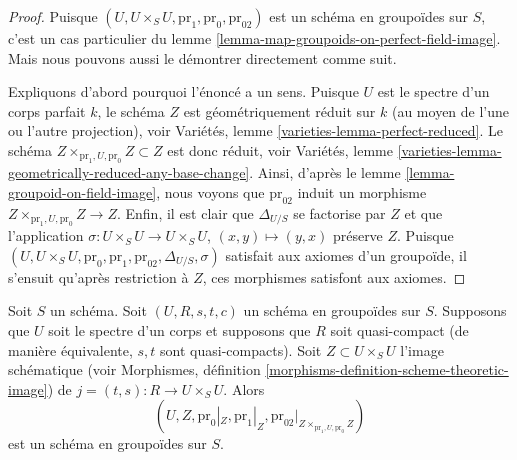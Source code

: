 \begin{proof}
Puisque $(U, U \times_S U, \text{pr}_1, \text{pr}_0, \text{pr}_{02})$
est un schéma en groupoïdes sur $S$, c'est un cas particulier du
lemme \ref{lemma-map-groupoids-on-perfect-field-image}.
Mais nous pouvons aussi le démontrer directement comme suit.

\medskip\noindent
Expliquons d'abord pourquoi l'énoncé a un sens. Puisque $U$ est le spectre
d'un corps parfait $k$, le schéma $Z$ est géométriquement réduit
sur $k$ (au moyen de l'une ou l'autre projection), voir
Variétés, lemme \ref{varieties-lemma-perfect-reduced}.
Le schéma $Z \times_{\text{pr}_1, U, \text{pr}_0} Z \subset Z$ est donc
réduit, voir
Variétés, lemme \ref{varieties-lemma-geometrically-reduced-any-base-change}.
Ainsi, d'après le
lemme \ref{lemma-groupoid-on-field-image},
nous voyons que $\text{pr}_{02}$ induit un morphisme
$Z \times_{\text{pr}_1, U, \text{pr}_0} Z \to Z$.
Enfin, il est clair que $\Delta_{U/S}$ se factorise par $Z$
et que l'application
$\sigma : U \times_S U \to U \times_S U$, $(x, y) \mapsto (y, x)$
préserve $Z$. Puisque
$(U, U \times_S U, \text{pr}_0, \text{pr}_1, \text{pr}_{02},
\Delta_{U/S}, \sigma)$
satisfait aux axiomes d'un groupoïde, il s'ensuit qu'après restriction
à $Z$, ces morphismes satisfont aux axiomes.
\end{proof}

\begin{lemma}
\label{lemma-quasi-compact-groupoid-on-field-image}
Soit $S$ un schéma. Soit $(U, R, s, t, c)$ un schéma en groupoïdes
sur $S$. Supposons que $U$ soit le spectre d'un corps et
supposons que $R$ soit quasi-compact (de manière équivalente, $s, t$ sont quasi-compacts).
Soit $Z \subset U \times_S U$ l'image schématique (voir
Morphismes, définition \ref{morphisms-definition-scheme-theoretic-image})
de $j = (t, s) : R \to U \times_S U$.
Alors
$$
(U, Z, \text{pr}_0|_Z, \text{pr}_1|_Z,
\text{pr}_{02}|_{Z \times_{\text{pr}_1, U, \text{pr}_0} Z})
$$
est un schéma en groupoïdes sur $S$.
\end{lemma}

